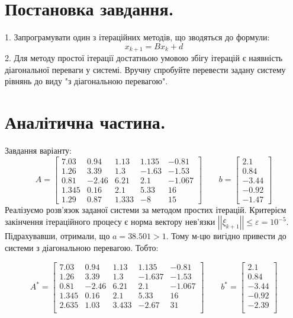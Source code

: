 \documentclass[14pt,a4paper]{scrartcl}
\theoremstyle{definition}
\theoremstyle{remark}
\theoremstyle{definition}
\theoremstyle{definition}
\begin{document}
\section{Постановка завдання.}

1. Запрограмувати один з ітераційних методів, що зводяться до формули:
$$ x_{k+1} = Bx_k + d $$
2. Для методу простої ітерації достатньою умовою збігу ітерацій є наявність
діагональної переваги у системі. Вручну спробуйте перевести задану
систему рівнянь до виду "з діагональною перевагою".


\section{Аналітична частина.}
Завдання варіанту:
$$
A = \begin{bmatrix}
  7.03 & 0.94 & 1.13 & 1.135 & -0.81 \\
	1.26 & 3.39 & 1.3 & -1.63 & -1.53  \\
	0.81 & -2.46 & 6.21 & 2.1 & -1.067\\
	1.345 & 0.16 & 2.1 & 5.33 & 16 \\
	1.29 & 0.87 & 1.333 & -8 & 15
\end{bmatrix} \qquad
b = \begin{bmatrix} 2.1 \\ 0.84 \\ -3.44 \\ -0.92 \\ -1.47 \end{bmatrix}
$$
Реалізуємо розв'язок заданої системи за методом простих ітерацій. Критерієм закінчення ітераційного процесу є норма вектору
нев'язки $\left| \left| \xi_{k+1}  \right|  \right| \leq \varepsilon = 10^{-5} $. Підрахувавши, отримали, що $ a = 38.501 > 1$. Тому м-цю вигідно привести до системи з діагональною перевагою. Тобто:

$$
A^* = \begin{bmatrix}
7.03&0.94&1.13&1.135&-0.81\\
1.26&3.39&1.3&-1.637&-1.53\\
0.81&-2.46&6.21&2.1&-1.067\\
1.345&0.16&2.1&5.33&16\\
2.635&1.03&3.433&-2.67&31\\
\end{bmatrix}
\qquad b^* = \begin{bmatrix}
2.1\\
0.84\\
-3.44\\
-0.92\\
-2.39\\
\end{bmatrix}
$$
\pagebreak
\end{document}
